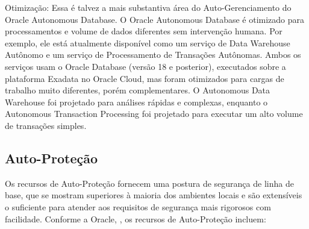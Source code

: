 \begin{alineas}
\item Otimização: Essa é talvez a mais substantiva área do Auto-Gerenciamento do Oracle Autonomous Database. O Oracle Autonomous Database é otimizado para processamentos e volume de dados diferentes sem intervenção humana. Por exemplo, ele está atualmente disponível como um serviço de Data Warehouse Autônomo e um serviço de Processamento de Transações Autônomas. Ambos os serviços usam o Oracle Database (versão 18 e posterior), executados sobre a plataforma Exadata no Oracle Cloud, mas foram otimizados para cargas de trabalho muito diferentes, porém complementares. O Autonomous Data Warehouse foi projetado para análises rápidas e complexas, enquanto o Autonomous Transaction Processing foi projetado para executar um alto volume de transações simples.
\end{alineas}



\subsection{Auto-Proteção}

Os recursos de Auto-Proteção fornecem uma postura de segurança de linha de base, que se mostram superiores à maioria dos ambientes locais e são extensíveis o suficiente para atender aos requisitos de segurança mais rigorosos com facilidade. Conforme a Oracle, \cite{WPProtecao}, os recursos de Auto-Proteção incluem:

